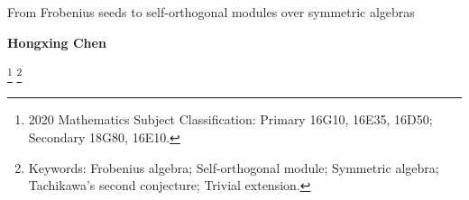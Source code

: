 \documentclass[11pt]{article}
\begin{document}
\newcommand{\rHom}{{\rm\mathbb R}{\rm Hom}\,}
\newcommand{\pdim}{\pd}
\newcommand{\Hom}{{\rm Hom}}
\newcommand{\Coker}{{\rm Coker}}
\newcommand{ \Ker  }{{\rm Ker}}
\newcommand{ \Cone }{{\rm Con}}
\newcommand{ \Img  }{{\rm Im}}
\newcommand{\Ext}{{\rm Ext}}
\newcommand{\StHom}{{\rm \underline{Hom}}}
\newcommand{\StEnd}{{\rm \underline{End}}}
\newcommand{\KK}{I\!\!K}
\newcommand{\gm}{{\rm _{\Gamma_M}}}
\newcommand{\gmr}{{\rm _{\Gamma_M^R}}}
\def\vez{\varepsilon}\def\bz{\bigoplus}  \def\sz {\oplus}
\def\epa{\xrightarrow} \def\inja{\hookrightarrow}
\newcommand{\lra}{\longrightarrow}
\newcommand{\llra}{\longleftarrow}
\newcommand{\lraf}[1]{\stackrel{#1}{\lra}}
\newcommand{\llaf}[1]{\stackrel{#1}{\llra}}
\newcommand{\ra}{\rightarrow}
\newcommand{\dk}{{\rm dim_{_{k}}}}
\newcommand{\holim}{{\rm Holim}}
\newcommand{\hocolim}{{\rm Hocolim}}
\newcommand{\colim}{{\rm colim\, }}
\newcommand{\limt}{{\rm lim\, }}
\newcommand{\Add}{{\rm Add }}
\newcommand{\Prod}{{\rm Prod }}
\newcommand{\Tor}{{\rm Tor}}
\newcommand{\Cogen}{{\rm Cogen}}
\newcommand{\Tria}{{\rm Tria}}
\newcommand{\Loc}{{\rm Loc}}
\newcommand{\Coloc}{{\rm Coloc}}
\newcommand{\tria}{{\rm tria}}
\newcommand{\Con}{{\rm Con}}
\newcommand{\Thick}{{\rm Thick}}
\newcommand{\thick}{{\rm thick}}
\newcommand{\Sum}{{\rm Sum}}



{\Large \bf
\begin{center}
From Frobenius seeds to self-orthogonal modules
over symmetric algebras
\end{center}}

\medskip\centerline{\textbf{Hongxing Chen}}

\renewcommand{\thefootnote}{\alph{footnote}}
\setcounter{footnote}{-1} \footnote{2020 Mathematics Subject
Classification: Primary 16G10, 16E35, 16D50; Secondary 18G80, 16E10.}
\renewcommand{\thefootnote}{\alph{footnote}}
\setcounter{footnote}{-1} \footnote{Keywords: Frobenius algebra; Self-orthogonal module;
Symmetric algebra; Tachikawa's second conjecture; Trivial extension.}
\end{document}
